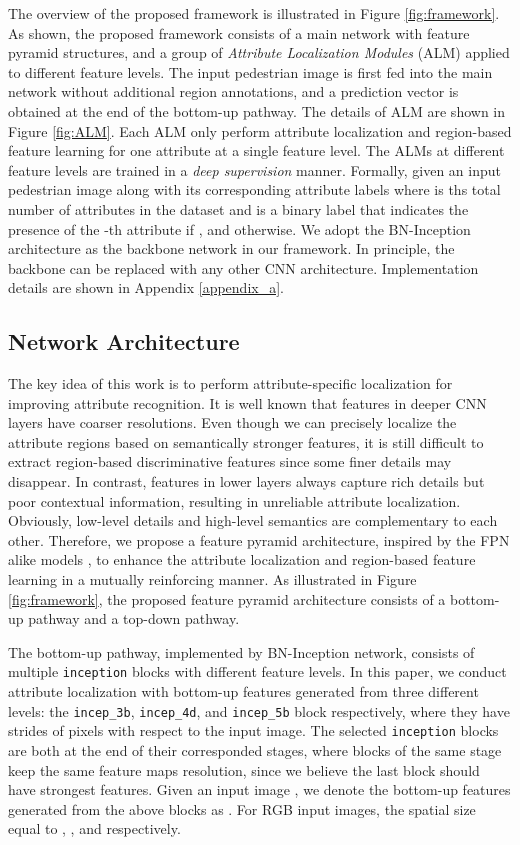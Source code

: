\documentclass[10pt,twocolumn,letterpaper]{article}
\begin{document}
The overview of the proposed framework is illustrated in Figure \ref{fig:framework}.
As shown, the proposed framework consists of a main network with feature pyramid structures, and a group of \textit{Attribute Localization Modules} (ALM) applied to different feature levels.
The input pedestrian image is first fed into the main network without additional region annotations, and a prediction vector is obtained at the end of the bottom-up pathway.
The details of ALM are shown in Figure \ref{fig:ALM}.
Each ALM only perform attribute localization and region-based feature learning for one attribute at a single feature level.
The ALMs at different feature levels are trained in a \textit{deep supervision} manner.
Formally, given an input pedestrian image  along with its corresponding attribute labels  where  is ths total number of attributes in the dataset and  is a binary label that indicates the presence of the -th attribute if , and  otherwise.
We adopt the BN-Inception \cite{bn} architecture as the backbone network in our framework. In principle, the backbone can be replaced with any other CNN architecture.
Implementation details are shown in Appendix \ref{appendix_a}.

\subsection{Network Architecture}
The key idea of this work is to perform attribute-specific localization for improving attribute recognition.
It is well known that features in deeper CNN layers have coarser resolutions.
Even though we can precisely localize the attribute regions based on semantically stronger features, it is still difficult to extract region-based discriminative features since some finer details may disappear.
In contrast, features in lower layers always capture rich details but poor contextual information, resulting in unreliable attribute localization.
Obviously, low-level details and high-level semantics are complementary to each other.
Therefore, we propose a feature pyramid architecture, inspired by the FPN alike models \cite{fpn,zhu2018bidirectional}, to enhance the attribute localization and region-based feature learning in a mutually reinforcing manner.
As illustrated in Figure \ref{fig:framework}, the proposed feature pyramid architecture consists of a bottom-up pathway and a top-down pathway.

The bottom-up pathway, implemented by BN-Inception network, consists of multiple \verb'inception' blocks with different feature levels.
In this paper, we conduct attribute localization with bottom-up features generated from three different levels: the \verb'incep_3b', \verb'incep_4d', and \verb'incep_5b' block respectively, where they have strides of  pixels with respect to the input image.
The selected \verb'inception' blocks are both at the end of their corresponded stages, where blocks of the same stage keep the same feature maps resolution, since we believe the last block should have strongest features.
Given an input image , we denote the bottom-up features generated from the above blocks as .
For  RGB input images, the spatial size  equal to , , and  respectively.
\end{document}
